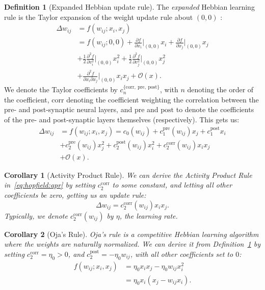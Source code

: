 \documentclass{article}
\newtheorem{corollary}{Corollary}[subsection]
\theoremstyle{definition}
\newtheorem{definition}{Definition}[subsection]
\begin{document}
\begin{definition}[Expanded Hebbian update rule]\label{def:expanded-hebb}
  The \textit{expanded} Hebbian learning rule is the Taylor expansion
  of the weight update rule about $(0, 0)$
  \parencite{gerstner_mathematical_2002}:
  \begin{align*}
    \Delta w_{ij} &= f(w_{ij}; x_i, x_j) \\
    &= f(w_{ij}; 0, 0) + \frac{\partial f}{\partial x_i} \big|_{(0,
    0)} x_i + \frac{\partial f}{\partial x_j}
    \big|_{(0, 0)} x_j \\
    &+ \frac{1}{2} \frac{\partial^2 f}{\partial v^2_i} \big|_{(0, 0)}
    x_i^2 + \frac{1}{2} \frac{\partial^2 f}{\partial v^2_j}\big|_{(0,
    0)} x_j^2 \\
    &+ \frac{\partial^2 f}{\partial x_i \partial x_j}\big|_{(0, 0)}
    x_i x_j + \mathcal{O}(x).
  \end{align*}
  We denote the Taylor coefficients by
  $c_n^{\{\text{corr},~\text{pre},~\text{post}\}}$, with
  $n$ denoting the order of the coefficient, $\text{corr}$ denoting
  the coefficient
  weighting the correlation between the pre- and post-synaptic neural
  layers, and
  $\text{pre}$ and $\text{post}$ to denote the coefficients of the
  pre- and post-synaptic
  layers themselves (respectively).
  This gets us:
  \begin{align*}
    \Delta w_{ij} &= f(w_{ij}; x_i, x_j) =
    c_0 (w_{ij}) + c_1^\text{pre} (w_{ij}) x_j + c_1^\text{post} x_i \\
    &+ c_2^\text{pre} (w_{ij}) x_j^2 + c_2^\text{post} (w_{ij}) x_i^2
    + c_2^\text{corr} (w_{ij}) x_i x_j \\
    &+ \mathcal{O} (x).
  \end{align*}
\end{definition}

\begin{corollary}[Activity Product Rule]
  We can derive the Activity Product Rule in~\autoref{eq:hopfield:apr}
  by setting $c_2^\text{corr}$ to some constant, and letting all other
  coefficients be zero, getting us an update rule:
  $$
  \Delta w_{ij} = c_2^\text{corr} (w_{ij}) x_i x_j.
  $$
  Typically, we denote $c_2^\text{corr} (w_{ij})$ by $\eta$,
  the \textit{learning rate}.
\end{corollary}

\begin{corollary}[Oja's Rule]
  \textit{Oja's rule} \parencite{oja_simplified_1982} is a competitive Hebbian
  learning algorithm where the weights are naturally normalized. We can
  derive it from Definition~\ref{def:expanded-hebb} by setting
  $c_2^\text{corr} = \eta_0 > 0$,
  and $c_2^\text{post} = - \eta_0 w_{ij}$, with all other
  coefficients set to $0$:
  \begin{align*}
    f(w_{ij}; x_i, x_j) &= \eta_0 x_i x_j - \eta_0 w_{ij} x_i^2 \\
    &= \eta_0 x_i (x_j - w_{ij} x_i).
  \end{align*}
\end{corollary}
\end{document}
